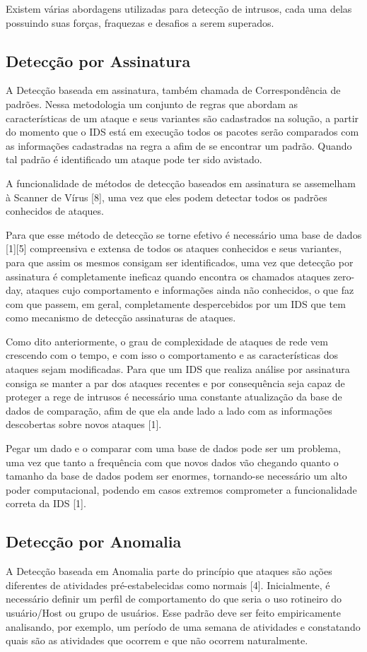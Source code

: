 \documentclass[conference]{IEEEtran}
\begin{document}
Existem várias abordagens utilizadas para detecção de intrusos, cada uma delas possuindo suas forças, fraquezas e desafios a serem superados.


\subsection{Detecção por Assinatura}
A Detecção baseada em assinatura, também chamada de Correspondência de padrões. Nessa metodologia um conjunto de regras que abordam as características de um ataque e seus variantes são cadastrados na solução, a partir do momento que o IDS está em execução todos os pacotes serão comparados com as informações cadastradas na regra a afim de se encontrar um padrão. Quando tal padrão é identificado um ataque pode ter sido avistado.

A funcionalidade de métodos de detecção baseados em assinatura se assemelham à Scanner de Vírus [8], uma vez que eles podem detectar todos os padrões conhecidos de ataques.

Para que esse método de detecção se torne efetivo é necessário uma base de dados [1][5] compreensiva e extensa de todos os ataques conhecidos e seus variantes, para que assim os mesmos consigam ser identificados, uma vez que detecção por assinatura é completamente ineficaz quando encontra os chamados ataques zero-day, ataques cujo comportamento e informações ainda não conhecidos, o que faz com que passem, em geral, completamente despercebidos por um IDS que tem como mecanismo de detecção assinaturas de ataques.

Como dito anteriormente, o grau de complexidade de ataques de rede vem crescendo com o tempo, e com isso o comportamento e as características dos ataques sejam modificadas. Para que um IDS que realiza análise por assinatura consiga se manter a par dos ataques recentes e por consequência seja capaz de proteger a rege de intrusos é necessário uma constante atualização da base de dados de comparação, afim de que ela ande lado a lado com as informações descobertas sobre novos ataques [1].

Pegar um dado e o comparar com uma base de dados pode ser um problema, uma vez que tanto a frequência com que novos dados vão chegando quanto o tamanho da base de dados podem ser enormes, tornando-se necessário um alto poder computacional, podendo em casos extremos comprometer a funcionalidade correta da IDS [1].


\subsection{Detecção por Anomalia}
A Detecção baseada em Anomalia parte do princípio que ataques são ações diferentes de atividades pré-estabelecidas como normais [4]. Inicialmente, é necessário definir um perfil de comportamento do que seria o uso rotineiro do usuário/Host ou grupo de usuários. Esse padrão deve ser feito empiricamente analisando, por exemplo, um período de uma semana de atividades e constatando quais são as atividades que ocorrem e que não ocorrem naturalmente.
\end{document}
